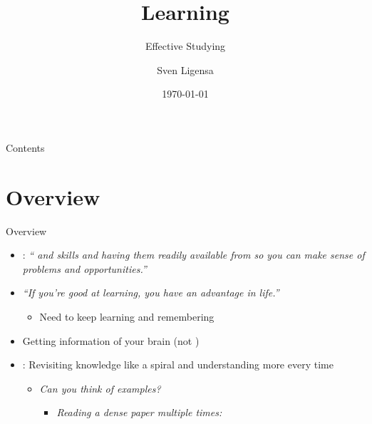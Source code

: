 \documentclass{ercisbeamer}
\title{Learning}
\subtitle{Effective Studying}
\author{Sven Ligensa}
\institute{European Research Center for Information Systems (ERCIS)}
\date{\today}
\begin{document}
\begin{frame}
    \begin{tbox}
        \titlepage
    \end{tbox}
\end{frame}
\setbgimage{}

\begin{frame}{Contents}
    \tableofcontents
\end{frame}

\section{Overview}
\begin{frame}{Overview}
    \begin{tbox}
        \begin{itemize}
            \item {}: \emph{`` and skills and having them readily available from  so you can make sense of  problems and opportunities.'' }
            \item \emph{``If you're good at learning, you have an advantage in life.'' }
            \begin{itemize}
                \item Need to keep learning and remembering 
            \end{itemize}
            \item Getting information  of your brain (not ) \todo{Source]} %
            \item {}: Revisiting knowledge like a spiral and understanding more every time
            \begin{itemize}
                \item \emph{Can you think of examples?} \pause
                \begin{itemize}
                    \item \emph{Reading a dense paper multiple times: }

\end{itemize}
\end{itemize}
\end{itemize}
\end{tbox}
\end{frame}
\end{document}
